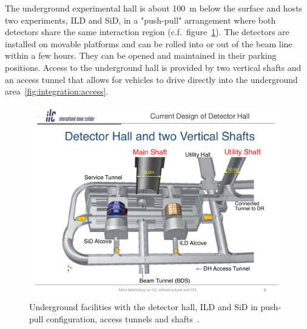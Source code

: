 The underground experimental hall is about 100~m below the surface and hosts two experiments, ILD and SiD, in a "push-pull" arrangement where both detectors share the same interaction region (c.f.~figure~\ref{fig:integration:underground}). The detectors are installed on movable platforms and can be rolled into or out of the beam line within a few hours. They can be opened and maintained in their parking positions. Access to the underground hall is provided by two vertical shafts and an access tunnel that allows for vehicles to drive directly into the underground area~\ref{fig:integration:access}.

\begin{figure}[h!]
\includegraphics[width=1.0\hsize]{Integration/fig/Underground_Facilities.pdf}
\caption{\label{fig:integration:underground}Underground facilities with the detector hall, ILD and SiD in push-pull configuration, access tunnels and shafts~\cite{ild:bib:underground_facilities}. }
\end{figure}



